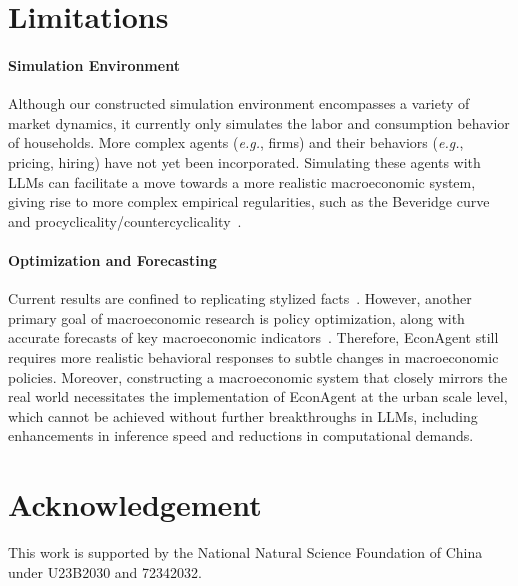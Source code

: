 \documentclass[11pt]{article}
\begin{document}
\section{Limitations}
\paragraph{Simulation Environment} Although our constructed simulation environment encompasses a variety of market dynamics, it currently only simulates the labor and consumption behavior of households. More complex agents (\textit{e.g.}, firms) and their behaviors (\textit{e.g.}, pricing, hiring) have not yet been incorporated. Simulating these agents with LLMs can facilitate a move towards a more realistic macroeconomic system, giving rise to more complex empirical regularities, such as the Beveridge curve and procyclicality/countercyclicality~\cite{dawid2018agent}.

\paragraph{Optimization and Forecasting} Current results are confined to replicating stylized facts~\cite{dawid2018agent}. However, another primary goal of macroeconomic research is policy optimization, along with accurate forecasts of key macroeconomic indicators~\cite{poledna2023economic}. Therefore, EconAgent still requires more realistic behavioral responses to subtle changes in macroeconomic policies. Moreover, constructing a macroeconomic system that closely mirrors the real world necessitates the implementation of EconAgent at the urban scale level, which cannot be achieved without further breakthroughs in LLMs, including enhancements in inference speed and reductions in computational demands.

\section*{Acknowledgement}
This work is supported by the National Natural Science Foundation of China under U23B2030 and 72342032.


\clearpage



\appendix

\end{document}
